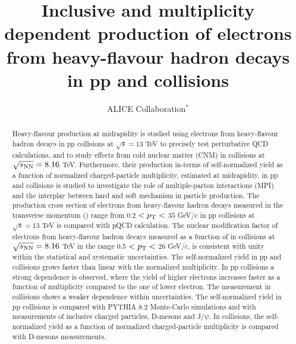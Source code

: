 \documentclass[ALICE,manyauthors]{ALICE_analysis_notes}
\begin{document}
%

\begin{titlepage}
%
\PHdate{\today}
%
\title{ Inclusive and multiplicity dependent production of electrons from heavy-flavour hadron decays in pp and \pPb collisions}
%
\author{ALICE Collaboration$^{*}$}
%
\begin{abstract}

Heavy-flavour production at midrapidity is studied using electrons from heavy-flavour hadron decays in pp collisions at $\sqrt{s}=13$ TeV to precisely test perturbative QCD calculations, and to study effects from cold nuclear matter (CNM) in \pPb collisions at $\sqrt{s_{\rm{NN}}} = 8.16$ TeV. Furthermore, their production in-terms of self-normalized yield as a function of normalized charged-particle multiplicity, estimated at midrapidity, in pp and \pPb collisions is studied to investigate the role of multiple-parton interactions (MPI) and the interplay between hard and soft mechanism in particle production. The production cross section of electrons from heavy-flavour hadron decays measured in the transverse momentum (\pt) range from $0.2$ $< p_{\rm T} <$ $35$ GeV$/c$ in pp collisions at $\sqrt{s}=13$ TeV is compared with pQCD calculation. The nuclear modification factor of electrons from heavy-flavour hadron decays measured as a function of \pt in \pPb collisions at $\sqrt{s_{\rm{NN}}} = 8.16$ TeV in the range 0.5 $< p_{\rm T} <$ 26 GeV/$c$, is consistent with unity within the statistical and systematic uncertainties. The self-normalized yield in pp and \pPb collisions grows faster than linear with the normalized multiplicity. In pp collisions a strong \pt dependence is observed, where the yield of higher \pt electrons increases faster as a function of multiplicity compared to the one of lower \pt electron. The measurement in \pPb collisions shows a weaker \pt dependence within uncertainties. The self-normalized yield in pp collisions is compared with PYTHIA 8.2 Monte-Carlo simulations and with measurements of inclusive charged particles, D-mesons and J/$\psi$. In \pPb collisions, the self-normalized yield as a function of normalized charged-particle multiplicity is compared with D-mesons measurements. 


\end{abstract}
\end{titlepage}
\end{document}
